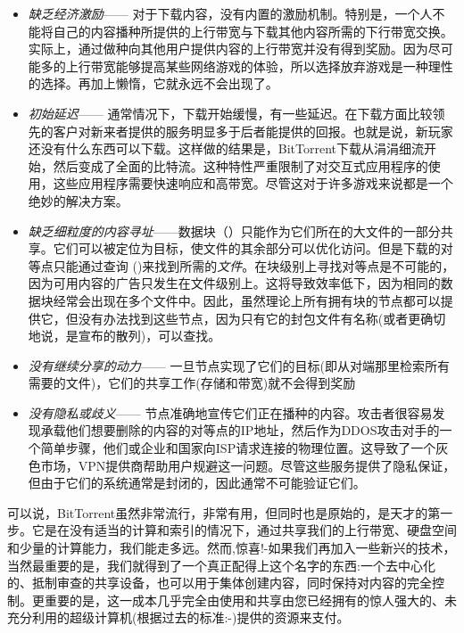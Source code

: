 \begin{itemize}
\item \emph{缺乏经济激励}——
对于下载内容，没有内置的激励机制。特别是，一个人不能将自己的内容播种所提供的上行带宽与下载其他内容所需的下行带宽交换。实际上，通过做种向其他用户提供内容的上行带宽并没有得到奖励。因为尽可能多的上行带宽能够提高某些网络游戏的体验，所以选择放弃游戏是一种理性的选择。再加上懒惰，它就永远不会出现了。

\item \emph{初始延迟}——
通常情况下，下载开始缓慢，有一些延迟。在下载方面比较领先的客户对新来者提供的服务明显多于后者能提供的回报。也就是说，新玩家还没有什么东西可以下载。这样做的结果是，BitTorrent下载从涓涓细流开始，然后变成了全面的比特流。这种特性严重限制了对交互式应用程序的使用，这些应用程序需要快速响应和高带宽。尽管这对于许多游戏来说都是一个绝妙的解决方案。
 
\item \emph{缺乏细粒度的内容寻址}——数据块（）只能作为它们所在的大文件的一部分共享。它们可以被定位为目标，使文件的其余部分可以优化访问。但是下载的对等点只能通过查询 ()来找到所需的\emph{文件}。在块级别上寻找对等点是不可能的，因为可用内容的广告只发生在文件级别上。这将导致效率低下，因为相同的数据块经常会出现在多个文件中。因此，虽然理论上所有拥有块的节点都可以提供它，但没有办法找到这些节点，因为只有它的封包文件有名称(或者更确切地说，是宣布的散列)，可以查找。

\item \emph{没有继续分享的动力}——
一旦节点实现了它们的目标(即从对端那里检索所有需要的文件)，它们的共享工作(存储和带宽)就不会得到奖励\item \emph{没有隐私或歧义}——
节点准确地宣传它们正在播种的内容。攻击者很容易发现承载他们想要删除的内容的对等点的IP地址，然后作为DDOS攻击对手的一个简单步骤，他们或企业和国家向ISP请求连接的物理位置。这导致了一个灰色市场，VPN提供商帮助用户规避这一问题。尽管这些服务提供了隐私保证，但由于它们的系统通常是封闭的，因此通常不可能验证它们。 
\end{itemize}

可以说，BitTorrent虽然非常流行，非常有用，但同时也是原始的，是天才的第一步。它是在没有适当的计算和索引的情况下，通过共享我们的上行带宽、硬盘空间和少量的计算能力，我们能走多远。然而,惊喜!-如果我们再加入一些新兴的技术，当然最重要的是，我们就得到了一个真正配得上这个名字的东西:一个去中心化的、抵制审查的共享设备，也可以用于集体创建内容，同时保持对内容的完全控制。更重要的是，这一成本几乎完全由使用和共享由您已经拥有的惊人强大的、未充分利用的超级计算机(根据过去的标准:-)提供的资源来支付。

